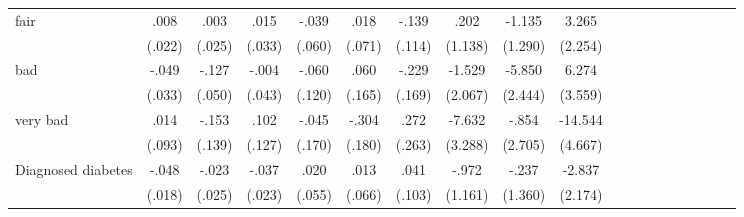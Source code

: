 \documentclass[12pt,english,british]{article}
\newcommand{\sym}[1]{\rlap{#1}}%
\begin{document}
\begin{table}
\begin{center}
\begin{adjustbox}{max width=\linewidth}
{\begin{tabular}{l*{9}{S
S}}
\hspace*{10mm}fair            &     .008         &     .003         &     .015         &    -.039         &     .018         &    -.139         &     .202         &   -1.135         &    3.265         \\
                &   (.022)         &   (.025)         &   (.033)         &   (.060)         &   (.071)         &   (.114)         &  (1.138)         &  (1.290)         &  (2.254)         \\

\hspace*{10mm}bad             &    -.049         &    -.127\sym{**} &    -.004         &    -.060         &     .060         &    -.229         &   -1.529         &   -5.850\sym{**} &    6.274\sym{*}  \\
                &   (.033)         &   (.050)         &   (.043)         &   (.120)         &   (.165)         &   (.169)         &  (2.067)         &  (2.444)         &  (3.559)         \\

\hspace*{10mm}very bad        &     .014         &    -.153         &     .102         &    -.045         &    -.304\sym{*}  &     .272         &   -7.632\sym{**} &    -.854         &  -14.544\sym{***}\\
                &   (.093)         &   (.139)         &   (.127)         &   (.170)         &   (.180)         &   (.263)         &  (3.288)         &  (2.705)         &  (4.667)         \\

Diagnosed diabetes&    -.048\sym{***}&    -.023         &    -.037         &     .020         &     .013         &     .041         &    -.972         &    -.237         &   -2.837         \\
                &   (.018)         &   (.025)         &   (.023)         &   (.055)         &   (.066)         &   (.103)         &  (1.161)         &  (1.360)         &  (2.174)         \\


\end{tabular}}
\end{adjustbox}
\end{center}
\end{table}
\end{document}
